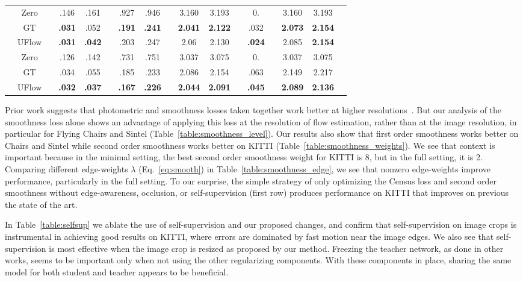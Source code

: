 \documentclass[runningheads]{llncs}
\begin{document}
\begin{wraptable}{r}{0.45\columnwidth}
{\begin{tabular}{lcccccccccccccccc}
    \midrule
    \parbox[t]{2mm}{}
    & Zero && .146 & .161 && .927 & .946 && 3.160 & 3.193 && 0. && 3.160 & 3.193 \\
    & GT && \textbf{.031} & .052 && \textbf{.191} & \textbf{.241} && \textbf{2.041} & \textbf{2.122} && .032 && \textbf{2.073} & \textbf{2.154} \\
    & UFlow && \textbf{.031} & \textbf{.042} && .203 & .247 && 2.06 & 2.130 && \textbf{.024} && 2.085 & \textbf{2.154} \\
    \midrule
    \parbox[t]{2mm}{}
    & Zero && .126 & .142 && .731 & .751 && 3.037 & 3.075 && 0. && 3.037 & 3.075 \\
    & GT && .034 & .055 && .185 & .233 && 2.086 & 2.154 && .063 && 2.149 & 2.217 \\
    & UFlow && \textbf{.032} & \textbf{.037} && \textbf{.167} & \textbf{.226} && \textbf{2.044} & \textbf{2.091} && \textbf{.045} && \textbf{2.089} & \textbf{2.136} \\
    \bottomrule
    \end{tabular}}
    \vspace{-0.2cm}
\end{wraptable}

 Prior work suggests that photometric and smoothness losses taken together work better at higher resolutions~\cite{godard2019digging}. But our analysis of the smoothness loss alone shows an advantage of applying this loss at the resolution of flow estimation, rather than at the image resolution, in particular for Flying Chairs and Sintel (Table~\ref{table:smoothness_level}). Our results also show that first order smoothness works better on Chairs and Sintel while second order smoothness works better on KITTI (Table~\ref{table:smoothness_weights}). We see that context is important because in the minimal setting, the best second order smoothness weight for KITTI is 8, but in the full setting, it is 2. Comparing different edge-weights $\lambda$ (Eq.~\ref{eq:smooth}) in Table~\ref{table:smoothness_edge}, we see that nonzero edge-weights improve performance, particularly in the full setting. To our surprise, the simple strategy of only optimizing the Census loss and second order smoothness without edge-awareness, occlusion, or self-supervision (first row) produces performance on KITTI that improves on previous the state of the art.

 In Table~\ref{table:selfsup} we ablate the use of self-supervision and our proposed changes, and confirm that self-supervision on image crops is instrumental in achieving good results on KITTI, where errors are dominated by fast motion near the image edges. We also see that self-supervision is most effective when the image crop is resized as proposed by our method. Freezing the teacher network, as done in other works, seems to be important only when not using the other regularizing components. With these components in place, sharing the same model for both student and teacher appears to be beneficial.
\end{document}
